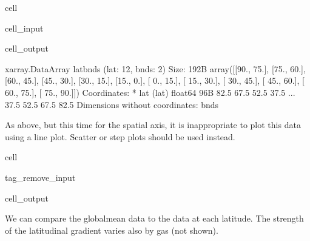 \documentclass[letterpaper,10pt,english]{jupyterBook}
\begin{document}
\begin{sphinxuseclass}{cell}\begin{sphinxVerbatimInput}

\begin{sphinxuseclass}{cell_input}
\begin{sphinxVerbatim}[commandchars=\\\{\}]
\PYG{p}{[}\PYG{p}{]}
\end{sphinxVerbatim}

\end{sphinxuseclass}\end{sphinxVerbatimInput}
\begin{sphinxVerbatimOutput}

\begin{sphinxuseclass}{cell_output}
\begin{sphinxVerbatim}[commandchars=\\\{\}]
\PYGZlt{}xarray.DataArray \PYGZsq{}lat\PYGZus{}bnds\PYGZsq{} (lat: 12, bnds: 2)\PYGZgt{} Size: 192B
array([[\PYGZhy{}90., \PYGZhy{}75.],
       [\PYGZhy{}75., \PYGZhy{}60.],
       [\PYGZhy{}60., \PYGZhy{}45.],
       [\PYGZhy{}45., \PYGZhy{}30.],
       [\PYGZhy{}30., \PYGZhy{}15.],
       [\PYGZhy{}15.,   0.],
       [  0.,  15.],
       [ 15.,  30.],
       [ 30.,  45.],
       [ 45.,  60.],
       [ 60.,  75.],
       [ 75.,  90.]])
Coordinates:
  * lat      (lat) float64 96B \PYGZhy{}82.5 \PYGZhy{}67.5 \PYGZhy{}52.5 \PYGZhy{}37.5 ... 37.5 52.5 67.5 82.5
Dimensions without coordinates: bnds
\end{sphinxVerbatim}

\end{sphinxuseclass}\end{sphinxVerbatimOutput}

\end{sphinxuseclass}
\sphinxAtStartPar
As above, but this time for the spatial axis,
it is inappropriate to plot this data using a line plot.
Scatter or step plots should be used instead.

\begin{sphinxuseclass}{cell}
\begin{sphinxuseclass}{tag_remove_input}\begin{sphinxVerbatimOutput}

\begin{sphinxuseclass}{cell_output}
\noindent{}

\end{sphinxuseclass}\end{sphinxVerbatimOutput}

\end{sphinxuseclass}
\end{sphinxuseclass}
\sphinxAtStartPar
We can compare the global\sphinxhyphen{}mean data
to the data at each latitude.
The strength of the latitudinal gradient varies also by gas (not shown).
\end{document}

